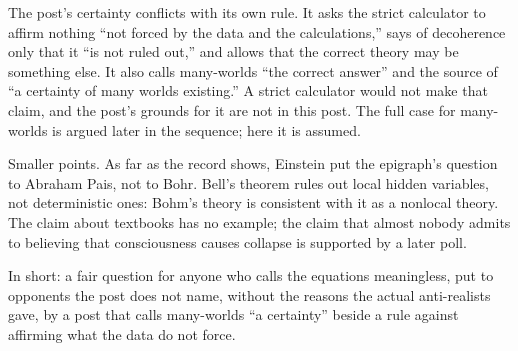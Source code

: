 \begin{afterword}
The post's certainty conflicts with its own rule. It asks the strict calculator to affirm nothing ``not forced by the data and the calculations,'' says of decoherence only that it ``is not ruled out,'' and allows that the correct theory may be something else. It also calls many-worlds ``the correct answer'' and the source of ``a certainty of many worlds existing.'' A strict calculator would not make that claim, and the post's grounds for it are not in this post. The full case for many-worlds is argued later in the sequence; here it is assumed.

Smaller points. As far as the record shows, Einstein put the epigraph's question to Abraham Pais, not to Bohr. Bell's theorem rules out local hidden variables, not deterministic ones: Bohm's theory is consistent with it as a nonlocal theory. The claim about textbooks has no example; the claim that almost nobody admits to believing that consciousness causes collapse is supported by a later poll.

In short: a fair question for anyone who calls the equations meaningless, put to opponents the post does not name, without the reasons the actual anti-realists gave, by a post that calls many-worlds ``a certainty'' beside a rule against affirming what the data do not force.
\end{afterword}
